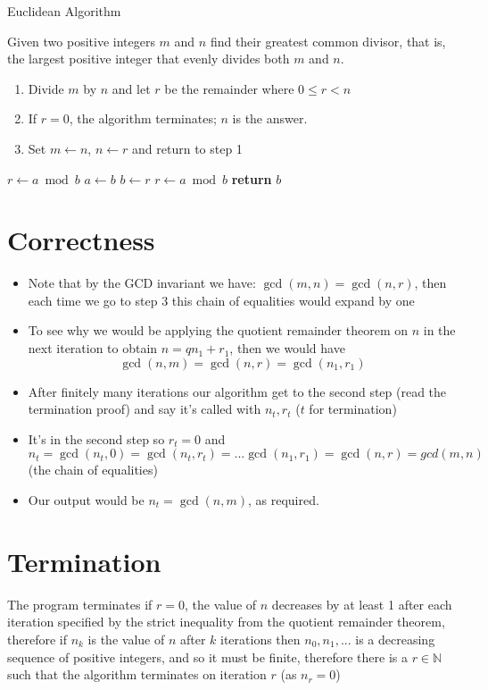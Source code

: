 \documentclass{standalone}
\begin{document}
\begin{defn*}{Euclidean Algorithm}

Given two positive integers $m$ and $n$ find their greatest common divisor, that is, the largest positive integer that evenly divides both $m$ and $n$.

\begin{enumerate}
  \item Divide $m$ by $n$ and let $r$ be the remainder where $0 \le r < n$
  \item If $r =0$, the algorithm terminates; $n$ is the answer.
  \item Set $m \leftarrow n$, $n \leftarrow r$ and return to step 1
\end{enumerate}

\begin{algorithmic}[1]
  \State $r\gets a\bmod b$
  \State $a\gets b$
  \State $b\gets r$
  \State $r\gets a\bmod b$
  \EndWhile\label{euclidendwhile}
  \State \textbf{return} $b$
  \EndProcedure
\end{algorithmic}

\section{Correctness}
\begin{itemize}
  \item Note that by the GCD invariant we have: $\gcd(m,n) = \gcd(n,r)$, then each time we go to step 3 this chain of equalities would expand by one
  \item To see why we would be applying the quotient remainder theorem on $n$ in the next iteration to obtain $n = q n_1 + r_1$, then we would have 
  \[
    \gcd(n,m) = \gcd(n,r) = \gcd(n_1, r_1)
  \]
  \item After finitely many iterations our algorithm get to the second step (read the termination proof) and say it's called with $n_t, r_t$ ($t$ for termination)
  \item It's in the second step so  $r_t = 0$ and $n_t = \gcd(n_t,0) = \gcd(n_t, r_t) = ... \gcd(n_1, r_1) = \gcd(n, r) = gcd(m,n)$ (the chain of equalities) 
  \item Our output would be $n_t = \gcd(n,m)$, as required.
\end{itemize}

\section{Termination}

The program terminates if $r = 0$, the value of $n$ decreases by at least 1 after each iteration specified by the strict inequality from the quotient remainder theorem, therefore if $n_k$ is the value of $n$ after $k$ iterations then $n_0, n_1, ...$ is a decreasing sequence of positive integers, and so it must be finite, therefore there is a $r \in \mathbb{N}$ such that the algorithm terminates on iteration $r$ (as $n_r = 0$)

\end{defn*}
\end{document}
